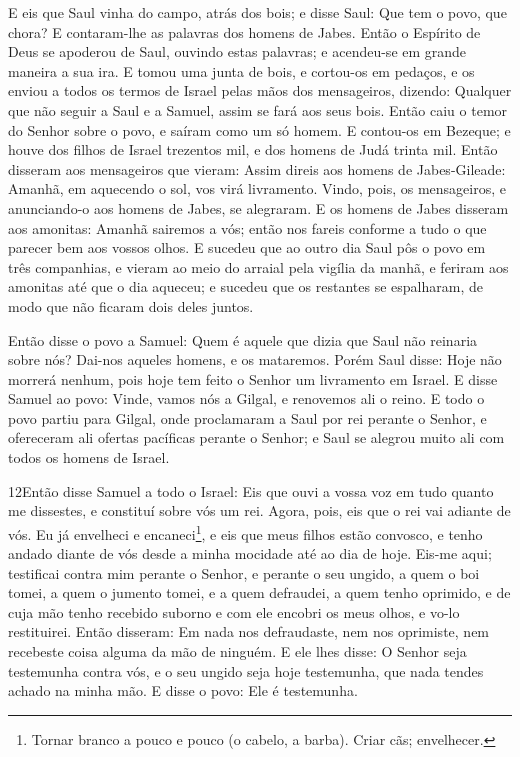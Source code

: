 E eis que Saul vinha do campo, atrás dos bois; e disse Saul: Que
tem o povo, que chora? E contaram-lhe as palavras dos homens de
Jabes. Então o Espírito de Deus se apoderou de Saul, ouvindo
estas palavras; e acendeu-se em grande maneira a sua ira. E
tomou uma junta de bois, e cortou-os em pedaços, e os enviou a todos
os termos de Israel pelas mãos dos mensageiros, dizendo: Qualquer
que não seguir a Saul e a Samuel, assim se fará aos seus bois. Então
caiu o temor do Senhor sobre o povo, e saíram como um só homem.
E contou-os em Bezeque; e houve dos filhos de Israel trezentos
mil, e dos homens de Judá trinta mil. Então disseram aos
mensageiros que vieram: Assim direis aos homens de Jabes-Gileade:
Amanhã, em aquecendo o sol, vos virá livramento. Vindo, pois, os
mensageiros, e anunciando-o aos homens de Jabes, se alegraram.
E os homens de Jabes disseram aos amonitas: Amanhã sairemos a
vós; então nos fareis conforme a tudo o que parecer bem aos vossos
olhos. E sucedeu que ao outro dia Saul pôs o povo em três
companhias, e vieram ao meio do arraial pela vigília da manhã, e
feriram aos amonitas até que o dia aqueceu; e sucedeu que os
restantes se espalharam, de modo que não ficaram dois deles juntos.

Então disse o povo a Samuel: Quem é aquele que dizia que Saul não
reinaria sobre nós? Dai-nos aqueles homens, e os mataremos.
Porém Saul disse: Hoje não morrerá nenhum, pois hoje tem
feito o Senhor um livramento em Israel. E disse Samuel ao
povo: Vinde, vamos nós a Gilgal, e renovemos ali o reino. E
todo o povo partiu para Gilgal, onde proclamaram a Saul por rei
perante o Senhor, e ofereceram ali ofertas pacíficas perante o
Senhor; e Saul se alegrou muito ali com todos os homens de Israel.

\medskip

\lettrine{12} Então disse Samuel a todo o Israel: Eis que ouvi
a vossa voz em tudo quanto me dissestes, e constituí sobre vós um
rei. Agora, pois, eis que o rei vai adiante de vós. Eu já
envelheci e encaneci\footnote{Tornar branco a pouco e pouco (o
cabelo, a barba). Criar cãs; envelhecer.}, e eis que meus filhos
estão convosco, e tenho andado diante de vós desde a minha mocidade
até ao dia de hoje. Eis-me aqui; testificai contra mim perante o
Senhor, e perante o seu ungido, a quem o boi tomei, a quem o jumento
tomei, e a quem defraudei, a quem tenho oprimido, e de cuja mão
tenho recebido suborno e com ele encobri os meus olhos, e vo-lo
restituirei. Então disseram: Em nada nos defraudaste, nem nos
oprimiste, nem recebeste coisa alguma da mão de ninguém. E ele
lhes disse: O Senhor seja testemunha contra vós, e o seu ungido seja
hoje testemunha, que nada tendes achado na minha mão. E disse o
povo: Ele é testemunha.


